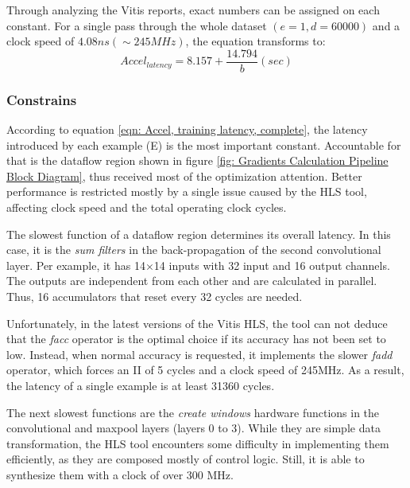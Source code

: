 Through analyzing the Vitis reports, exact numbers can be assigned on each constant. For a single pass through the whole dataset $( e=1, d=60000 )$ and a clock speed of $4.08 ns (\sim245MHz)$, the equation transforms to: %
\begin{equation}
    Accel_{latency} = 8.157 + \frac{ 14.794 }{b} (sec) %
    \label{eqn: accel, training latency in ms}
\end{equation}
\subsubsection{Constrains}
\label{Constrains}
According to equation \ref{eqn: Accel, training latency, complete}, the latency introduced by each example (E) is the most important constant. Accountable for that is the dataflow region shown in figure \ref{fig: Gradients Calculation Pipeline Block Diagram}, thus received most of the optimization attention. Better performance is restricted mostly by a single issue caused by the HLS tool, affecting clock speed and the total operating clock cycles. %

The slowest function of a dataflow region determines its overall latency. In this case, it is the \textit{sum filters} in the back-propagation of the second convolutional layer. Per example, it has 14$\times$14 inputs with 32 input and 16 output channels. The outputs are independent from each other and are calculated in parallel. Thus, 16 accumulators that reset every 32 cycles are needed. %

Unfortunately, in the latest versions of the Vitis HLS, the tool can not deduce that the \textit{facc} operator is the optimal choice if its accuracy has not been set to low. Instead, when normal accuracy is requested, it implements the slower \textit{fadd} operator, which forces an II of 5 cycles and a clock speed of 245MHz. As a result, the latency of a single example is at least 31360 cycles. %

The next slowest functions are the \textit{create windows} hardware functions in the convolutional and maxpool layers (layers 0 to 3). While they are simple data transformation, the HLS tool encounters some difficulty in implementing them efficiently, as they are composed mostly of control logic. Still, it is able to synthesize them with a clock of over 300 MHz.%

